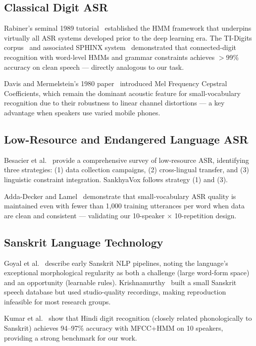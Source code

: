 \documentclass[12pt,a4paper]{article}
\begin{document}
\subsection{Classical Digit ASR}

Rabiner's seminal 1989 tutorial~\cite{rabiner1989hmm} established the HMM
framework that underpins virtually all ASR systems developed prior to the
deep learning era.
The TI-Digits corpus~\cite{leonard1984tidigits} and associated SPHINX
system~\cite{lee1990sphinx} demonstrated that connected-digit recognition
with word-level HMMs and grammar constraints achieves $>$99\% accuracy on
clean speech --- directly analogous to our task.

Davis and Mermelstein's 1980 paper~\cite{davis1980mfcc} introduced Mel
Frequency Cepstral Coefficients, which remain the dominant acoustic feature
for small-vocabulary recognition due to their robustness to linear channel
distortions --- a key advantage when speakers use varied mobile phones.

\subsection{Low-Resource and Endangered Language ASR}

Besacier et al.~\cite{besacier2014asr} provide a comprehensive survey of
low-resource ASR, identifying three strategies: (1) data collection campaigns,
(2) cross-lingual transfer, and (3) linguistic constraint integration.
SankhyaVox follows strategy (1) and (3).

Adda-Decker and Lamel~\cite{addadecker1999multilingual} demonstrate that
small-vocabulary ASR quality is maintained even with fewer than 1,000 training
utterances per word when data are clean and consistent --- validating our
10-speaker $\times$ 10-repetition design.

\subsection{Sanskrit Language Technology}

Goyal et al.~\cite{goyal2012sanskrit} describe early Sanskrit NLP pipelines,
noting the language's exceptional morphological regularity as both a challenge
(large word-form space) and an opportunity (learnable rules).
Krishnamurthy~\cite{krishnamurthy2016sanskrit} built a small Sanskrit speech
database but used studio-quality recordings, making reproduction infeasible
for most research groups.

Kumar et al.~\cite{kumar2012hindi} show that Hindi digit recognition (closely
related phonologically to Sanskrit) achieves 94--97\% accuracy with
MFCC+HMM on 10 speakers, providing a strong benchmark for our work.
\end{document}
